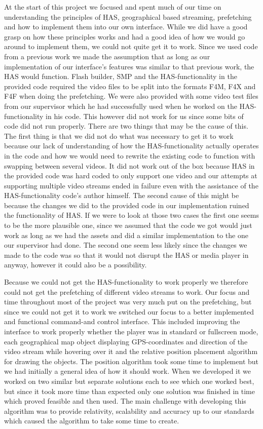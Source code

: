 At the start of this project we focused and spent much of our time on understanding the principles of HAS, geographical based streaming, prefetching and how to implement them into our own interface. While we did have a good grasp on how these principles works and had a good idea of how we would go around to implement them, we could not quite get it to work. Since we used code from a previous work we made the assumption that as long as our implementation of our interface's features was similar to that previous work, the HAS would function. Flash builder, SMP and the HAS-functionality in the provided code required the video files to be split into the formats F4M, F4X and F4F when doing the prefetching. We were also provided with some video test files from our supervisor which he had successfully used when he worked on the HAS-functionality in his code. This however did not work for us since some bits of code did not run properly. There are two things that may be the cause of this. The first thing is that we did not do what was necessary to get it to work because our lack of understanding of how the HAS-functionality actually operates in the code and how we would need to rewrite the existing code to function with swapping between several videos. It did not work out of the box because HAS in the provided code was hard coded to only support one video and our attempts at supporting multiple video streams ended in failure even with the assistance of the HAS-functionality code's author himself. The second cause of this might be because the changes we did to the provided code in our implementation ruined the functionality of HAS. If we were to look at those two cases the first one seems to be the more plausible one, since we assumed that the code we got would just work as long as we had the assets and did a similar implementation to the one our supervisor had done. The second one seem less likely since the changes we made to the code was so that it would not disrupt the HAS or media player in anyway, however it could also be a possibility. 

Because we could not get the HAS-functionality to work properly we therefore could not get the prefetching of different video streams to work. Our focus and time throughout most of the project was very much put on the prefetching, but since we could not get it to work we switched our focus to a better implemented and functional command-and control interface. This included improving the interface to work properly whether the player was in standard or fullscreen mode, each geographical map object displaying GPS-coordinates and direction of the video stream while hovering over it and the relative position placement algorithm for drawing the objects. The position algorithm took some time to implement but we had initially a general idea of how it should work. When we developed it we worked on two similar but separate solutions each to see which one worked best, but since it took more time than expected only one solution was finished in time which proved feasible and then used. The main challenge with developing this algorithm was to provide relativity, scalability and accuracy up to our standards which caused the algorithm to take some time to create.

